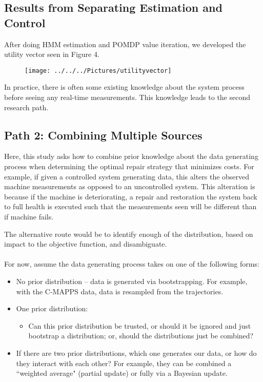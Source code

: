 \documentclass[english]{article}
\numberwithin{equation}{section}
\begin{document}
	\subsection*{Results from Separating Estimation and Control}
	After doing HMM estimation and POMDP value iteration, we developed the utility vector seen in Figure 4.
	
		\begin{figure}
		\centering
		\texttt{[image: ../../../Pictures/utilityvector]}
		\caption[Utility vector]{}
		\label{fig:utilityvec}
	\end{figure}
	
	In practice, there is often some existing knowledge about the system process before seeing any real-time measurements. This knowledge leads to the second research path.
	
	\subsection*{Path 2: Combining Multiple Sources}
	
	Here, this study asks how to combine prior knowledge about the data generating process when determining the optimal repair strategy that minimizes costs. For example, if given a controlled system generating data, this alters the observed machine measurements as opposed to an uncontrolled system. This alteration is because if the machine is deteriorating, a repair and restoration the system back to full health is executed such that the measurements seen will be different than if machine fails.
	
	The alternative route would be to identify enough of the distribution, based on impact to the objective function, and disambiguate. 
	\\
	\\
	For now, assume the data generating process takes on one of the following forms:
	\begin{itemize}
		\item No prior distribution -- data is generated via bootstrapping. For example, with the C-MAPPS data, data is resampled from the trajectories.
		\item One prior distribution:
		\begin{itemize}
			\item Can this prior distribution be trusted, or should it be ignored and just bootstrap a distribution; or, should the distributions just be combined?
		\end{itemize}
		\item If there are two prior distributions, which one generates our data, or how do they interact with each other? For example, they can be combined a ``weighted average" (partial update) or fully via a Bayesian update.
	\end{itemize}
	
\end{document}

